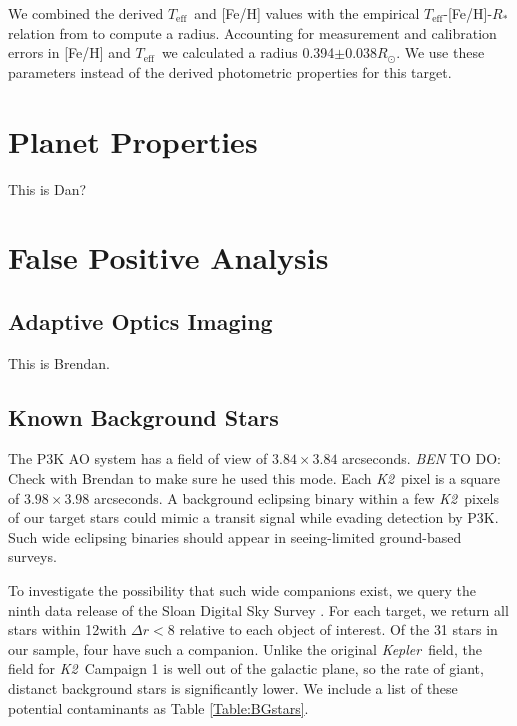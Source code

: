 \documentclass{emulateapj}
\newcommand{\project}[1]{\textsl{#1}}
\newcommand{\kep}{\project{Kepler}}
\newcommand{\KT}{\project{K2}}
\newcommand\teff{\ensuremath{T_\text{eff}}}
\newcommand{\todo}[3]{{\color{#2} \emph{#1} TO DO: #3}}
\newcommand{\btmtodo}[1]{\todo{BEN}{red}{#1}}
\begin{document}
We combined the derived \teff\ and [Fe/H] values with the empirical 
\teff-[Fe/H]-$R_*$ relation from \citet{Mann15} to compute a radius. 
Accounting for measurement and calibration errors in [Fe/H] and \teff\ we calculated 
a radius 0.394$\pm0.038R_\odot$. 
We use these parameters instead of the derived photometric properties for this target.

\section{Planet Properties}

This is Dan?

\section{False Positive Analysis}
\subsection{Adaptive Optics Imaging}

This is Brendan.

\subsection{Known Background Stars}
The P3K AO system has a field of view of $3.84 \times 3.84$ arcseconds.
\btmtodo{Check with Brendan to make sure he used this mode}.
Each \KT\ pixel is a square of $3.98 \times 3.98$ arcseconds. 
A background eclipsing binary within a few \KT\ pixels of our target 
stars could mimic a transit signal while evading detection by P3K.
Such wide eclipsing binaries should appear in seeing-limited ground-based
surveys.

To investigate the possibility that such wide companions exist,
we query the ninth data release of the Sloan Digital Sky Survey 
\citep[SDSS DR9,][]{Ahn12}. 
For each target, we return
all stars within 12\arcsec with $\Delta r < 8$ relative to each object
of interest.
Of the 31 stars in our sample, four have such a companion.
Unlike the original \kep\ field, the field for \KT\ Campaign 1 is 
well out of the galactic plane, so the rate of giant, distanct background
stars is significantly lower.
We include a list of these potential contaminants as Table 
\ref{Table:BGstars}.

\end{document}
